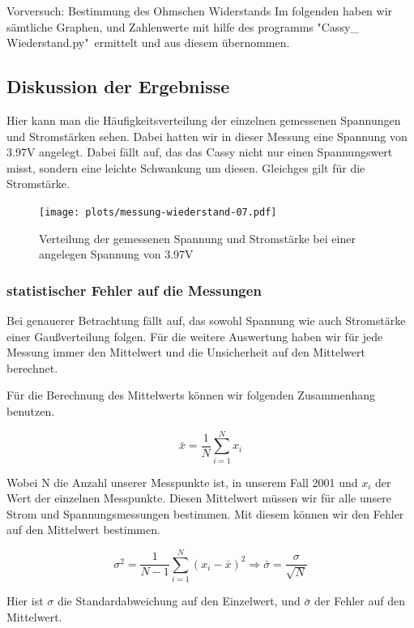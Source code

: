 \documentclass[twoside]{protokoll}
\begin{document}
\begin{aufgabe}{Vorversuch: Bestimmung des Ohmschen Widerstands}
Im folgenden haben wir sämtliche Graphen, und Zahlenwerte mit hilfe des 
programms "Cassy\_ Wiederstand.py"\ ermittelt und aus diesem übernommen. 
 
\subsection{Diskussion der Ergebnisse}
Hier kann man die Häufigkeitsverteilung der einzelnen gemessenen Spannungen und Stromstärken sehen.
Dabei hatten wir in dieser Messung eine Spannung von 3.97V angelegt.
Dabei fällt auf, das das Cassy nicht nur einen Spannungswert misst, sondern eine leichte Schwankung um diesen.
Gleichges gilt für die Stromstärke.


  \begin{figure}[H]
      \centering
      \texttt{[image: plots/messung-wiederstand-07.pdf]}
      \caption{Verteilung der gemessenen Spannung und Stromstärke bei einer angelegen Spannung von 3.97V}
  \end{figure}
  
\subsubsection{statistischer Fehler auf die Messungen} 
Bei genauerer Betrachtung fällt auf, das sowohl Spannung wie auch Stromstärke einer Gaußverteilung folgen.
Für die weitere Auswertung haben wir für jede Messung immer den Mittelwert und die Unsicherheit auf den Mittelwert berechnet.

Für die Berechnung des Mittelwerts können wir folgenden Zusammenhang benutzen. 

\begin{equation}
	\bar{x} =\frac{1}{N} \sum_{i = 1}^N x_i
\end{equation}

Wobei N die Anzahl unserer Messpunkte ist, in unserem Fall 2001 und $x_i$ der Wert der einzelnen Messpunkte. Diesen Mittelwert müssen wir für alle unsere Strom und Spannungsmessungen bestimmen. 
Mit diesem können wir den Fehler auf den Mittelwert bestimmen. 

\begin{equation}
	\sigma^2 = \frac{1}{N-1} \sum_{i = 1}^N (x_i - \bar{x})^2  \Rightarrow \bar{\sigma} = \frac{\sigma}{\sqrt{N}}
\end{equation}

Hier ist $\sigma$ die Standardabweichung auf den Einzelwert, und $\bar{\sigma}$ der Fehler auf den Mittelwert.


\end{aufgabe}
\end{document}

